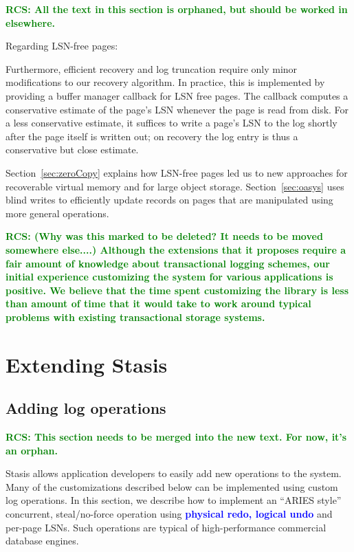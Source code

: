 \documentclass[letterpaper,twocolumn,10pt]{article}
\newcommand{\yad}{Stasis\xspace}
\newcommand{\diff}[1]{\textcolor{blue}{\bf #1}}
\newcommand{\rcs}[1]{\textcolor{green}{\bf RCS: #1}}
\begin{document}
\rcs{All the text in this section is orphaned, but should be worked in elsewhere.}

Regarding LSN-free pages:

Furthermore, efficient recovery and
log truncation require only minor modifications to our recovery
algorithm.  In practice, this is implemented by providing a buffer manager callback
for LSN free pages.  The callback computes a
conservative estimate of the page's LSN whenever the page is read from disk.
For a less conservative estimate, it suffices to write a page's LSN to
the log shortly after the page itself is written out; on recovery the
log entry is thus a conservative but close estimate.

Section~\ref{sec:zeroCopy} explains how LSN-free pages led us to new 
approaches for recoverable virtual memory and for large object storage.  
Section~\ref{sec:oasys} uses blind writes to efficiently update records 
on pages that are manipulated using more general operations.  

\rcs{ (Why was this marked to be deleted?  It needs to be moved somewhere else....)
Although the extensions that it proposes
require a fair amount of knowledge about transactional logging
schemes, our initial experience customizing the system for various
applications is positive.  We believe that the time spent customizing
the library is less than amount of time that it would take to work
around typical problems with existing transactional storage systems.
}



\section{Extending \yad}
\subsection{Adding log operations}
\label{sec:wal}

\rcs{This section needs to be merged into the new text.  For now, it's an orphan.}

\yad allows application developers to easily add new operations to the
system.  Many of the customizations described below can be implemented
using custom log operations.  In this section, we describe how to implement an
``ARIES style'' concurrent, steal/no-force operation using 
\diff{physical redo, logical undo} and per-page LSNs.
Such operations are typical of high-performance commercial database
engines.
\end{document}
